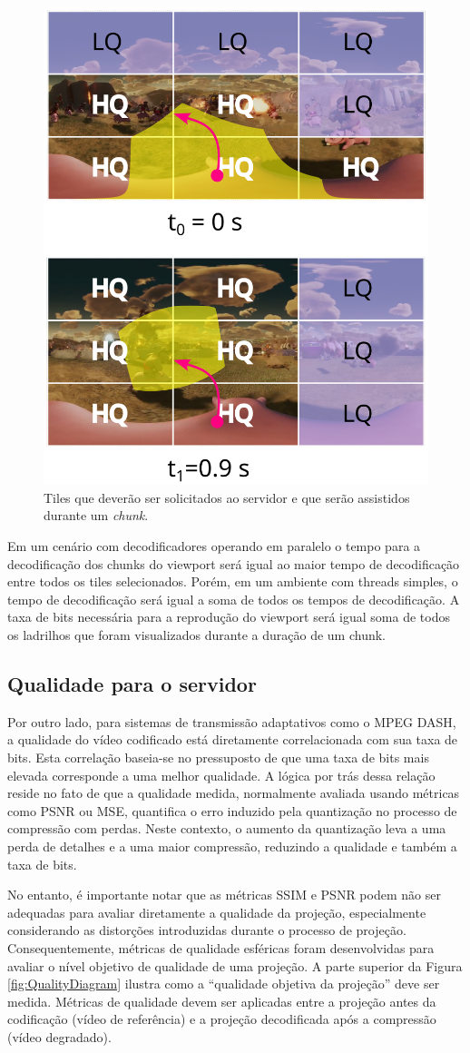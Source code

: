 \begin{figure}[h]
        \centering
        \includegraphics[width=0.5\linewidth]{fig/Streaming of Tiles 2.png}
        \caption{Tiles que deverão ser solicitados ao servidor e que serão assistidos durante um \textit{chunk}.}
        \label{fig:selectTiles}
\end{figure}

Em um cenário com decodificadores operando em paralelo o tempo para a decodificação dos chunks do viewport será igual ao maior tempo de decodificação entre todos os tiles selecionados. Porém, em um ambiente com threads simples, o tempo de decodificação será igual a soma de todos os tempos de decodificação. A taxa de bits necessária para a reprodução do viewport será igual soma de todos os ladrilhos que foram visualizados durante a duração de um chunk.

\subsection{Qualidade para o servidor}

Por outro lado, para sistemas de transmissão adaptativos como o MPEG DASH, a qualidade do vídeo codificado está diretamente correlacionada com sua taxa de bits. Esta correlação baseia-se no pressuposto de que uma taxa de bits mais elevada corresponde a uma melhor qualidade. A lógica por trás dessa relação reside no fato de que a qualidade medida, normalmente avaliada usando métricas como PSNR ou MSE, quantifica o erro induzido pela quantização no processo de compressão com perdas. Neste contexto, o aumento da quantização leva a uma perda de detalhes e a uma maior compressão, reduzindo a qualidade e também a taxa de bits.

No entanto, é importante notar que as métricas SSIM e PSNR podem não ser adequadas para avaliar diretamente a qualidade da projeção, especialmente considerando as distorções introduzidas durante o processo de projeção. Consequentemente, métricas de qualidade esféricas foram desenvolvidas para avaliar o nível objetivo de qualidade de uma projeção. A parte superior da Figura \ref{fig:QualityDiagram} ilustra como a “qualidade objetiva da projeção” deve ser medida. Métricas de qualidade devem ser aplicadas entre a projeção antes da codificação (vídeo de referência) e a projeção decodificada após a compressão (vídeo degradado).


